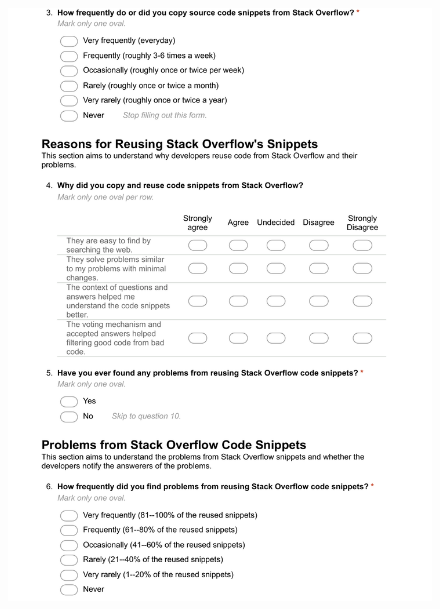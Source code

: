 \documentclass{svjour3}                     %
\begin{document}
\begin{figure}[H]
	\centering
	\includegraphics[width=0.9\linewidth]{visitor-2}
	\label{fig:visitor-2}
\end{figure}
\end{document}
